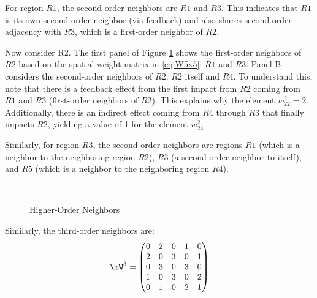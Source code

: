 \documentclass[english,12pt]{book}\usepackage[]{graphicx}\usepackage[]{xcolor}
\begin{document}
For region $R1$, the second-order neighbors are $R1$ and $R3$. This indicates that $R1$ is its own second-order neighbor (via feedback) and also shares second-order adjacency with $R3$, which is a first-order neighbor of $R2$. 

Now consider R2. The first panel of Figure \ref{fig:example_hon} shows the first-order neighbors of $R2$ based on the spatial weight matrix in \eqref{eq:W5x5}: $R1$ and $R3$. Panel B considers the second-order neighbors of $R2$: $R2$ itself and $R4$. To understand this, note that there is a feedback effect from the first impact from $R2$ coming from $R1$ and $R3$ (first-order neighbors of $R2$). This explains why the element $w^2_{22} = 2$. Additionally, there is an indirect effect coming from $R4$ through $R3$ that finally impacts $R2$, yielding a value of 1 for the element $w^2_{24}$.

Similarly, for region $R3$, the second-order neighbors are regions $R1$ (which is a neighbor to the neighboring region $R2$), $R3$ (a second-order neighbor to itself), and $R5$ (which is a neighbor to the neighboring region $R4$). 

\begin{figure}[ht]
\caption{Higher-Order Neighbors}
\label{fig:example_hon}
\centering
{}
\\
\vspace{1cm}
\end{figure}

Similarly, the third-order neighbors are: 
\begin{equation*}
\mW^3 = \begin{pmatrix}
      0 & 2 & 0 & 1 & 0 \\
      2 & 0 & 3 & 0 & 1 \\
      0 & 3 & 0 & 3 & 0 \\
      1 & 0 & 3 & 0 & 2 \\
      0 & 1 & 0 & 2 & 1
      \end{pmatrix}
\end{equation*}
\end{document}
